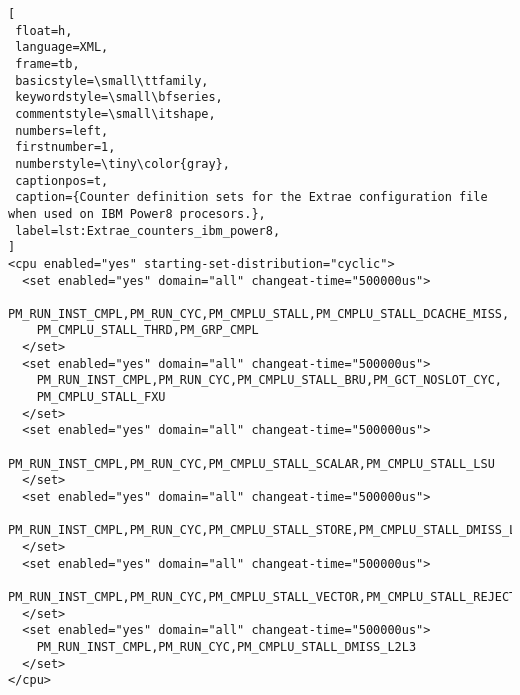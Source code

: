 \begin{lstlisting}[
 float=h,
 language=XML,
 frame=tb,
 basicstyle=\small\ttfamily,
 keywordstyle=\small\bfseries,
 commentstyle=\small\itshape,
 numbers=left,
 firstnumber=1,
 numberstyle=\tiny\color{gray},
 captionpos=t,
 caption={Counter definition sets for the Extrae configuration file when used on IBM Power8 procesors.},
 label=lst:Extrae_counters_ibm_power8,
]
<cpu enabled="yes" starting-set-distribution="cyclic">
  <set enabled="yes" domain="all" changeat-time="500000us">
    PM_RUN_INST_CMPL,PM_RUN_CYC,PM_CMPLU_STALL,PM_CMPLU_STALL_DCACHE_MISS,
    PM_CMPLU_STALL_THRD,PM_GRP_CMPL
  </set>
  <set enabled="yes" domain="all" changeat-time="500000us">
    PM_RUN_INST_CMPL,PM_RUN_CYC,PM_CMPLU_STALL_BRU,PM_GCT_NOSLOT_CYC,
    PM_CMPLU_STALL_FXU
  </set>
  <set enabled="yes" domain="all" changeat-time="500000us">
    PM_RUN_INST_CMPL,PM_RUN_CYC,PM_CMPLU_STALL_SCALAR,PM_CMPLU_STALL_LSU
  </set>
  <set enabled="yes" domain="all" changeat-time="500000us">
    PM_RUN_INST_CMPL,PM_RUN_CYC,PM_CMPLU_STALL_STORE,PM_CMPLU_STALL_DMISS_L3MISS
  </set>
  <set enabled="yes" domain="all" changeat-time="500000us">
    PM_RUN_INST_CMPL,PM_RUN_CYC,PM_CMPLU_STALL_VECTOR,PM_CMPLU_STALL_REJECT
  </set>
  <set enabled="yes" domain="all" changeat-time="500000us">
    PM_RUN_INST_CMPL,PM_RUN_CYC,PM_CMPLU_STALL_DMISS_L2L3
  </set>
</cpu>
\end{lstlisting}
